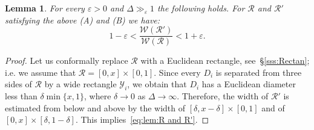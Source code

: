 \documentclass{amsart}
\newcommand{\1}{{\mathbb 1 }}
\newcommand{\Width}{{\mathcal W}}
\newcommand\YY{\mathcal{Y}}
\newcommand\RR{\mathcal{R}}
\newtheorem{lem}[thm]{Lemma}
\theoremstyle{remark}
\numberwithin{equation}{section}
\theoremstyle{definition}
\begin{document}
\begin{lem}
\label{lem:R and R'}
For every $\varepsilon>0$ and $\Delta \gg_\varepsilon 1$ the following holds. For $\RR$ and $\RR'$ satisfying the above (A) and (B) we have:
\begin{equation}
\label{eq:lem:R and R'}
 1-\varepsilon < \frac{\Width(\RR')}{\Width(\RR)}<1+\varepsilon.
 \end{equation}
\end{lem}
\begin{proof}
Let us conformally replace $\RR$ with a Euclidean rectangle, see~\S\ref{sss:Rectan}; i.e. we assume that $\RR=[0,x]\times [0,1]$. Since every $D_i$ is separated from three sides of $\RR$ by a wide rectangle $\YY_i$, we obtain that $D_i$ has a Euclidean diameter less than $\delta\min\{x,1\}$, where $\delta\to 0$ as $\Delta\to \infty$. Therefore, the width of $\RR'$ is estimated from below and above by the width of $[\delta, x-\delta]\times [0,1]$ and of $[0, x]\times [\delta,1-\delta]$. This implies~\eqref{eq:lem:R and R'}.   
\end{proof}
\end{document}
